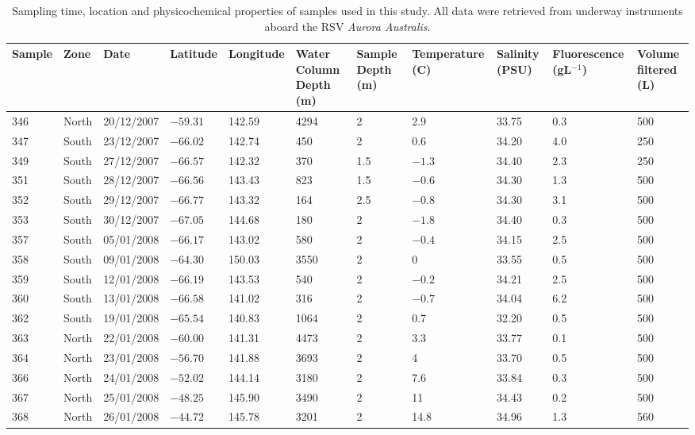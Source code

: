 \begin{sidewaystable}
\sffamily
\caption[Details of samples used in Polar Front study]{\sffamily{}Sampling time, location and physicochemical properties of samples used in this study.
All data were retrieved from underway instruments aboard the RSV \textit{Aurora Australis}.}
\label{tab:samplelist}
\smallskip
\begin{tabularx}{\textheight}{lllllXXXXXX}
\toprule
\textbf{Sample} & \textbf{Zone} & \textbf{Date} & \textbf{Latitude} & \textbf{Longitude} & \textbf{Water \linebreak Column \linebreak Depth (m)} & \textbf{Sample Depth (m)} & \textbf{Temperature (\textdegree{}C)} & \textbf{Salinity (PSU)} & \textbf{Fluorescence \linebreak (\textmu{}gL$^{-1}$)} & \textbf{Volume \linebreak filtered (L)}\\
\midrule

346 & North & 20/12/2007 & $-59.31$ & 142.59 & 4294 & 2 & 2.9 & 33.75 & 0.3 & 500\\
347 & South & 23/12/2007 & $-66.02$ & 142.74 & 450 & 2 & 0.6 & 34.20 & 4.0 & 250\\
349 & South & 27/12/2007 & $-66.57$ & 142.32 & 370 & 1.5 & $-1.3$ & 34.40 & 2.3 & 250\\
351 & South & 28/12/2007 & $-66.56$ & 143.43 & 823 & 1.5 & $-0.6$ & 34.30 & 1.3 & 500\\
352 & South & 29/12/2007 & $-66.77$ & 143.32 & 164 & 2.5 & $-0.8$ & 34.30 & 3.1 & 500\\
353 & South & 30/12/2007 & $-67.05$ & 144.68 & 180 & 2 & $-1.8$ & 34.40 & 0.3 & 500\\
357 & South & 05/01/2008 & $-66.17$ & 143.02 & 580 & 2 & $-0.4$ & 34.15 & 2.5 & 500\\
358 & South & 09/01/2008 & $-64.30$ & 150.03 & 3550 & 2 & 0 & 33.55 & 0.5 & 500\\
359 & South & 12/01/2008 & $-66.19$ & 143.53 & 540 & 2 & $-0.2$ & 34.21 & 2.5 & 500\\
360 & South & 13/01/2008 & $-66.58$ & 141.02 & 316 & 2 & $-0.7$ & 34.04 & 6.2 & 500\\
362 & South & 19/01/2008 & $-65.54$ & 140.83 & 1064 & 2 & 0.7 & 32.20 & 0.5 & 500\\
363 & North & 22/01/2008 & $-60.00$ & 141.31 & 4473 & 2 & 3.3 & 33.77 & 0.1 & 500\\
364 & North & 23/01/2008 & $-56.70$ & 141.88 & 3693 & 2 & 4 & 33.70 & 0.5 & 500\\
366 & North & 24/01/2008 & $-52.02$ & 144.14 & 3180 & 2 & 7.6 & 33.84 & 0.3 & 500\\
367 & North & 25/01/2008 & $-48.25$ & 145.90 & 3490 & 2 & 11 & 34.43 & 0.2 & 500\\
368 & North & 26/01/2008 & $-44.72$ & 145.78 & 3201 & 2 & 14.8 & 34.96 & 1.3 & 560\\

\bottomrule
\end{tabularx}
\end{sidewaystable}
